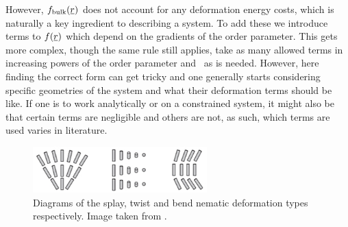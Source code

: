 \documentclass[12pt]{article}
\newcommand{\suf}[2]{\stackunder[0.5pt]{\stackunder[1pt]{\ensuremath{#1}}{\rule{\widthof{\ensuremath{#2}}*\real{0.9}}{.1ex}}}{}}
\newcommand{\su}[1]{\suf{#1}{#1}}
\newcommand{\mgrad}{\suf{\nabla}{K}}
\begin{document}
However, $f_\text{bulk}(\su{r})$ does not account for any deformation energy costs, which is naturally a key ingredient to describing a system.
To add these we introduce terms to $f(\su{r})$ which depend on the gradients of the order parameter.
This gets more complex, though the same rule still applies, take as many allowed terms in increasing powers of the order parameter and \mgrad\ as is needed.
However, here finding the correct form can get tricky and one generally starts considering specific geometries of the system and what their deformation terms should be like.
If one is to work analytically or on a constrained system, it might also be that certain terms are negligible and others are not, as such, which terms are used varies in literature.

\begin{figure}[t]
    \begin{center}
        \includegraphics[width=0.6\textwidth]{figures/nematic_deformations.jpg}
    \end{center}
    \caption{
        Diagrams of the splay, twist and bend nematic deformation types respectively.
        Image taken from \cite{suryantariImageFeatureExtraction2019}.
    }\label{fig:nem_deform}
\end{figure}
\end{document}
